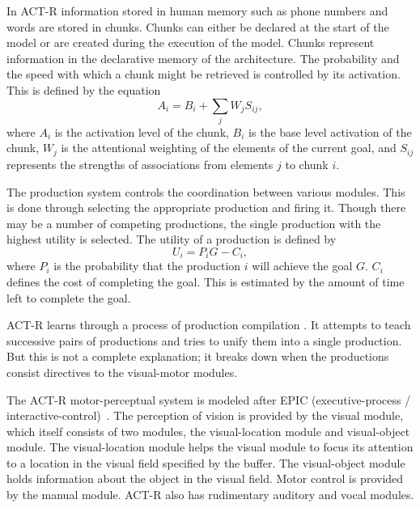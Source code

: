 In ACT-R information stored in human memory such as phone numbers and
words are stored in chunks. Chunks can either be declared at the start
of the model or are created during the execution of the model. Chunks
represent information in the declarative memory of the architecture. The
probability and the speed with which a chunk might be retrieved is
controlled by its activation. This is defined by the equation
%
\begin{equation}
  A_i = B_i + \sum_j W_j S_{ij},
\end{equation}
%
where $A_i$ is the activation level of the chunk, $B_i$ is the base
level activation of the chunk, $W_j$ is the attentional weighting of
the elements of the current goal, and $S_{ij}$ represents the strengths
of associations from elements $j$ to chunk $i$.

The production system controls the coordination between various
modules.  This is done through selecting the appropriate production
and firing it. Though there may be a number of competing productions,
the single production with the highest utility is selected.  The
utility of a production is defined by
%
\begin{equation}
  U_i = P_iG - C_i,
\end{equation}
%
where $P_i$ is the probability that the production $i$ will achieve
the goal $G$.  $C_i$ defines the cost of completing the goal. This is
estimated by the amount of time left to complete the goal.

ACT-R learns through a process of production compilation
\cite{oai:CiteSeerPSU:518586}. It attempts to teach successive pairs
of productions and tries to unify them into a single production. But
this is not a complete explanation; it breaks down when the
productions consist directives to the visual-motor modules.


The ACT-R motor-perceptual system is modeled after EPIC
(executive-process / interactive-control)~\cite{kieras1997overview}. The
perception of vision is provided by the visual module, which itself
consists of two modules, the visual-location module and visual-object
module. The visual-location module helps the visual module to focus
its attention to a location in the visual field specified by the
buffer. The visual-object module holds information about the object in
the visual field. Motor control is provided by the manual
module. ACT-R also has rudimentary auditory and vocal
modules\cite{anderson_jr-etal:2004a}.

